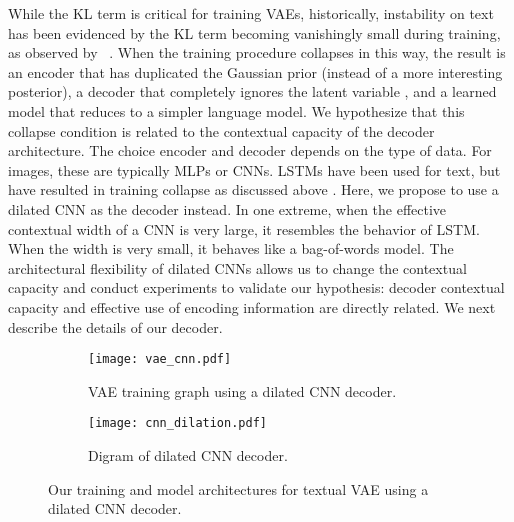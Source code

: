 \documentclass{article}
\begin{document}
While the KL term is critical for training VAEs, historically, instability on text has been evidenced by the KL term becoming vanishingly small during training, as observed by ~\citet{bowman2015generating}. When the training procedure collapses in this way, the result is an encoder that has duplicated the Gaussian prior (instead of a more interesting posterior), a decoder that completely ignores the latent variable , and a learned model that reduces to a simpler language model. We hypothesize that this collapse condition is related to the contextual capacity of the decoder architecture. The choice encoder and decoder depends on the type of data. For images, these are typically MLPs or CNNs. LSTMs have been used for text, but have resulted in training collapse as discussed above \cite{bowman2015generating}. Here, we propose to use a dilated CNN as the decoder instead. In one extreme, when the effective contextual width of a CNN is very large, it resembles the behavior of LSTM. When the width is very small, it behaves like a bag-of-words model. The architectural flexibility of dilated CNNs allows us to change the contextual capacity and conduct experiments to validate our hypothesis:
decoder contextual capacity and effective use of encoding information are directly related.
 We next describe the details of our decoder.





\begin{figure}[!t]
  \centering
  \begin{subfigure}[t]{0.8\linewidth}
    \texttt{[image: vae\_cnn.pdf]}
      \caption{VAE training graph using a dilated CNN decoder.}
      \label{fig:vae}
  \end{subfigure}
  \begin{subfigure}[t]{0.8\linewidth}
      \centering
      \texttt{[image: cnn\_dilation.pdf]}
      \caption{Digram of dilated CNN decoder.}
      \label{fig:cnn}
  \end{subfigure}
  \caption{Our training and model architectures for textual VAE using a dilated CNN decoder.}
\end{figure}
\end{document}
